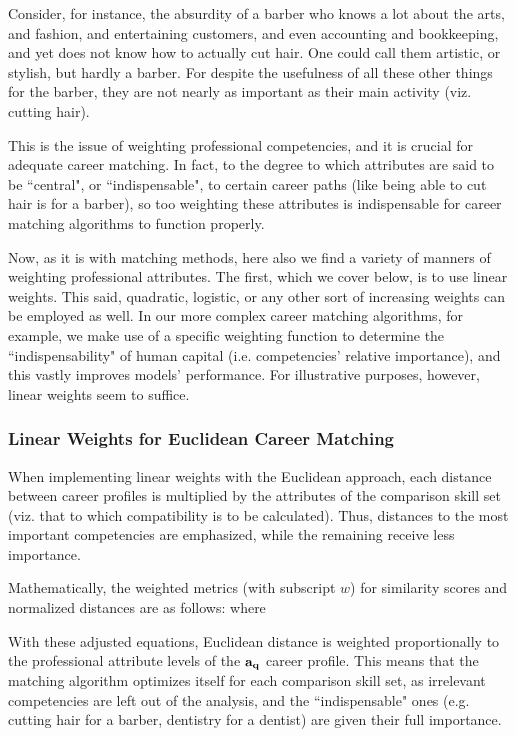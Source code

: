 \documentclass{article}
\begin{document}
Consider, for instance, the absurdity of a barber who knows a lot about the arts, and fashion, and entertaining customers, and even accounting and bookkeeping, and yet does not know how to actually cut hair. One could call them artistic, or stylish, but hardly a barber. For despite the usefulness of all these other things for the barber, they are not nearly as important as their main activity (viz. cutting hair).

This is the issue of weighting professional competencies, and it is crucial for adequate career matching. In fact, to the degree to which attributes are said to be ``central", or ``indispensable", to certain career paths (like being able to cut hair is for a barber), so too weighting these attributes is indispensable for career matching algorithms to function properly. 

Now, as it is with matching methods, here also we find a variety of manners of weighting professional attributes. The first, which we cover below, is to use linear weights. This said, quadratic, logistic, or any other sort of increasing weights can be employed as well. In our more complex career matching algorithms, for example, we make use of a specific weighting function to determine the ``indispensability" of human capital (i.e. competencies' relative importance), and this vastly improves models' performance. For illustrative purposes, however, linear weights seem to suffice.

\subsubsection{Linear Weights for Euclidean Career Matching}
When implementing linear weights with the Euclidean approach, each distance between career profiles is multiplied by the attributes of the comparison skill set (viz. that to which compatibility is to be calculated). Thus, distances to the most important competencies are emphasized, while the remaining receive less importance. 

Mathematically, the weighted metrics (with subscript $w$) for similarity scores and normalized distances are as follows:
\EqnWeightedSimilarity
where
\EqnWeightedDistance

With these adjusted equations, Euclidean distance is weighted proportionally to the professional attribute levels of the $\vb{a_{q}}$ career profile. This means that the matching algorithm optimizes itself for each comparison skill set, as irrelevant competencies are left out of the analysis, and the ``indispensable" ones (e.g. cutting hair for a barber, dentistry for a dentist) are given their full importance.
\end{document}
